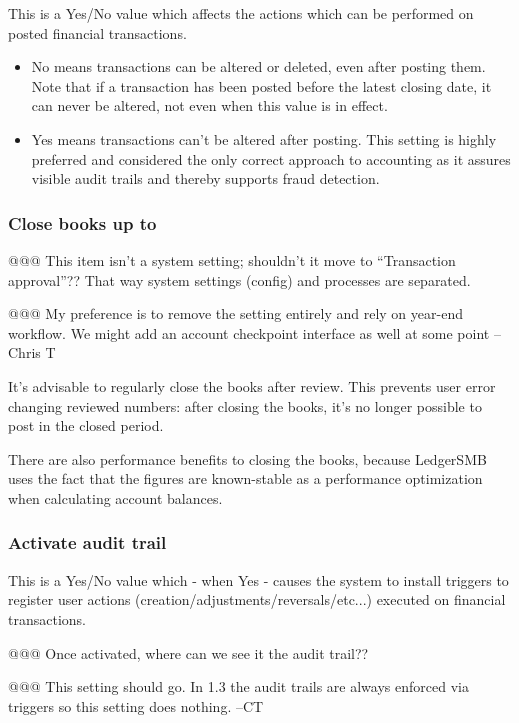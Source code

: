 This is a Yes/No value which affects the actions which can be performed on posted financial transactions.
\begin{itemize}
\item No means transactions can be altered or deleted, even after posting them. Note that
if a transaction has been posted before the latest closing date, it can never be altered,
not even when this value is in effect.
\item Yes means transactions can't be altered after posting. This setting is highly preferred and considered the only correct approach to accounting as it assures visible
audit trails and thereby supports fraud detection.
\end{itemize}

\subsubsection{Close books up to}
\label{subsubsec-company-config-audit-control-close-books}


@@@ This item isn't a system setting; shouldn't it move to ``Transaction approval''?? That way system settings (config) and processes are separated.

@@@ My preference is to remove the setting entirely and rely on year-end 
workflow.  We might add an account checkpoint interface as well at some point
--Chris T

It's advisable to regularly close the books after review. This prevents user error changing
reviewed numbers: after closing the books, it's no longer possible to post in the closed
period.

There are also performance benefits to closing the books, because LedgerSMB uses the
fact that the figures are known-stable as a performance optimization when calculating
account balances.

\subsubsection{Activate audit trail}
\label{subsubsec-company-config-audit-control-audit-trail}

This is a Yes/No value which - when Yes - causes the system to install triggers to register
user actions (creation/adjustments/reversals/etc...) executed on financial transactions.


@@@ Once activated, where can we see it the audit trail??

@@@ This setting should go.  In 1.3 the audit trails are always enforced via
triggers so this setting does nothing.  --CT

